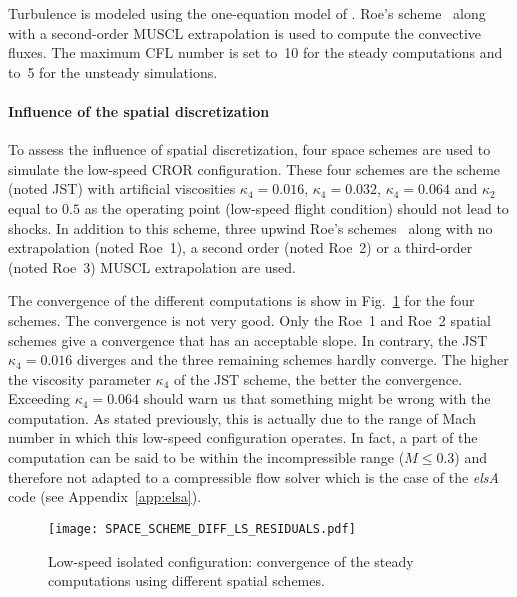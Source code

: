 Turbulence is modeled using the one-equation model of
\citet{Spalart1992}.  Roe's scheme~\cite{Roe1981} along with a 
second-order MUSCL extrapolation 
is used to compute the convective fluxes.
The maximum CFL number is set to~10 for the steady 
computations and to~5 for the unsteady simulations.

\paragraph{Influence of the spatial discretization}
\label{sub:dream_ls_spatial_discretization}

To assess the influence of spatial discretization, four 
space schemes are used to simulate the low-speed CROR configuration.
These four schemes are the \citet{Jameson1981} scheme (noted JST) with artificial
viscosities $\kappa_4 = 0.016$, $\kappa_4 = 0.032$, $\kappa_4 = 0.064$
and $\kappa_2$ equal to $0.5$ as the operating point (low-speed
flight condition) should not 
lead to shocks. In addition to this scheme, three upwind
Roe's schemes~\cite{Roe1981} along with no extrapolation (noted Roe~1),
a second order (noted Roe~2) or a third-order (noted Roe~3) 
MUSCL extrapolation are used.

The convergence of the different computations is show 
in Fig.~\ref{fig:dream_ls_space_scheme_residual}
for the four schemes. The convergence is not 
very good. Only the Roe~1 and Roe~2 spatial schemes give 
a convergence that has an acceptable slope. In contrary,
the JST~$\kappa_4 = 0.016$ diverges and the three
remaining schemes hardly converge. The higher the
viscosity parameter $\kappa_4$ of the JST scheme, the better
the convergence. Exceeding $\kappa_4 = 0.064$ should
warn us that something might be wrong with the computation.
As stated previously, this is actually due to the range of Mach
number in which this low-speed configuration operates. In fact,
a part of the computation can be said to be within the incompressible
range ($M \leq 0.3$) and therefore not adapted to a compressible
flow solver which is the case of the \emph{elsA} code 
(see Appendix~\ref{app:elsa}).
\begin{figure}[htp]
  \centering
  \texttt{[image: SPACE\_SCHEME\_DIFF\_LS\_RESIDUALS.pdf]}
  \caption{Low-speed isolated configuration: convergence of the
  steady computations using different spatial schemes.}
  \label{fig:dream_ls_space_scheme_residual}
\end{figure}

